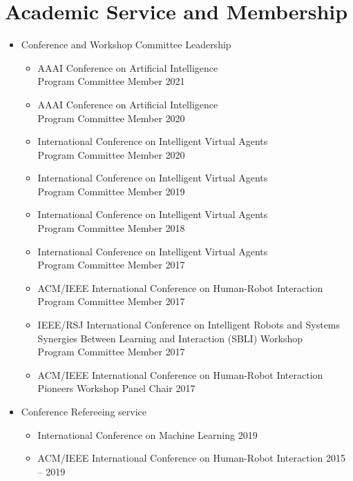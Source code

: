 \documentclass[10pt,letterpaper]{article}
\newcommand{\thing}[2]{{#1} \hfill {#2}}
\begin{document}
\section{Academic Service and Membership}
\begin{itemize}%
\item Conference and Workshop Committee Leadership
	\begin{itemize}\setlength\itemsep{0em}
	\item \thing{AAAI Conference on Artificial Intelligence\\Program Committee Member}{2021}
	\item \thing{AAAI Conference on Artificial Intelligence\\Program Committee Member}{2020}
	\item \thing{International Conference on Intelligent Virtual Agents\\Program Committee Member}{2020}
	\item \thing{International Conference on Intelligent Virtual Agents\\Program Committee Member}{2019}
	\item \thing{International Conference on Intelligent Virtual Agents\\Program Committee Member}{2018}
	\item \thing{International Conference on Intelligent Virtual Agents\\Program Committee Member}{2017}
	\item \thing{ACM/IEEE International Conference on Human-Robot Interaction\\Program Committee Member}{2017}
	\item \thing{IEEE/RSJ International Conference on Intelligent Robots and Systems\\Synergies Between Learning and Interaction (SBLI) Workshop\\Program Committee Member}{2017}
	\item \thing{ACM/IEEE International Conference on Human-Robot Interaction\\Pioneers Workshop Panel Chair}{2017}
	\end{itemize}
\item Conference Refereeing service
	\begin{itemize}\setlength\itemsep{0em}
	\item \thing{International Conference on Machine Learning}{2019}
	\item \thing{ACM/IEEE International Conference on Human-Robot Interaction}{2015 -- 2019}

\end{itemize}
\end{itemize}
\end{document}
